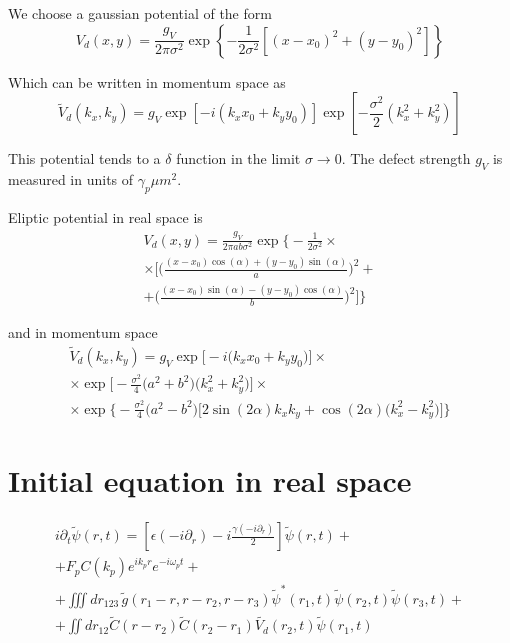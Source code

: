 \documentclass[a4paper,prb,10pt,aps,twocolumn]{revtex4-1}
\begin{document}
We choose a gaussian potential of the form
\begin{equation}
  \label{eq:143}
V_{d}(x,y)=\frac{g_{V}}{2\pi\sigma^{2}}\exp\left\{ -\frac{1}{2\sigma^{2}}\left[\left(x-x_{0}\right)^{2}+\left(y-y_{0}\right)^{2}\right]\right\}  
\end{equation}


Which can be written in momentum space as
\begin{equation}
  \label{eq:144}
\tilde{V}_{d}(k_x, k_y)= g_{V}\exp\left[-i(k_{x}x_{0}+k_{y}y_{0})\right]\exp\left[-\frac{\sigma^{2}}{2}\left(k_{x}^{2}+k_{y}^{2}\right)\right]  
\end{equation}

This potential tends to a $\delta$ function in the limit
$\sigma \rightarrow 0$. The defect strength $g_V$ is
measured in units of $\gamma_p \mu m^2$.

Eliptic potential in real space is
\begin{multline}
  \label{eq:146}
  V_{d}(x,y)=\frac{g_{V}}{2\pi a b\sigma^{2}}\exp\Bigg\{ -\frac{1}{2\sigma^{2}}\times\\\times
\Bigg[\Bigg(\frac{(x-x_{0})\cos(\alpha)+(y-y_{0})\sin(\alpha)}{a}\Bigg)^{2}+\\
+\Bigg(\frac{(x-x_{0})\sin(\alpha)-(y-y_{0})\cos(\alpha)}{b}\Bigg)^{2}\Bigg]\Bigg\}  
\end{multline}

and in momentum space
\begin{multline}
  \label{eq:147}
\tilde{V}_{d}(k_x, k_y)= g_{V}\exp\Bigg[-i\Bigg(k_{x}x_{0}+k_{y}y_{0}\Bigg)\Bigg]\times\\\times
\exp\Bigg[-\frac{\sigma^{2}}{4}\Bigg(a^{2}+b^{2}\Bigg)\Bigg(k_{x}^{2}+k_{y}^{2}\Bigg)\Bigg]\times\\\times
\exp\Bigg\{ -\frac{\sigma^{2}}{4}\Bigg(a^{2}-b^{2}\Bigg)\Bigg[2\sin(2\alpha)k_{x}k_{y}+\cos(2\alpha)\Bigg(k_{x}^{2}-k_{y}^{2}\Bigg)\Bigg]\Bigg\}  
\end{multline}





\section{Initial equation in real space}

\begin{multline}
  \label{eq:100}
i \partial_t\tilde{\psi}(r,t)=\left[\epsilon(-i\partial_{r})-i\frac{\gamma(-i\partial_{r})}{2}\right]\tilde{\psi}(r,t)+\\
+F_{p}C(k_p)e^{ik_{p}r}e^{-i\omega_{p}t}+\\
+\iiint dr_{123}\,\tilde{g}(r_1-r,r-r_2,r-r_3)\tilde{\psi}^*(r_1,t)\tilde{\psi}(r_2,t)\tilde{\psi}(r_3,t)+\\
+\iint dr_{12} \widetilde{C}\left(r-r_{2}\right)\widetilde{C}\left(r_{2}-r_{1}\right)\widetilde{V_{d}}(r_{2},t)\widetilde{\psi}(r_{1},t)
\end{multline}
\end{document}
